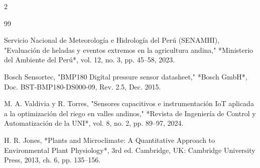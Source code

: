 \documentclass[a4paper, 11pt]{article}
\begin{document}
\begin{multicols}{2}
\begin{thebibliography}{99}

 Servicio Nacional de Meteorología e Hidrología del Perú (SENAMHI), "Evaluación de heladas y eventos extremos en la agricultura andina," *Ministerio del Ambiente del Perú*, vol. 12, no. 3, pp. 45--58, 2023.

 Bosch Sensortec, "BMP180 Digital pressure sensor datasheet," *Bosch GmbH*, Doc. BST-BMP180-DS000-09, Rev. 2.5, Dec. 2015.

 M. A. Valdivia y R. Torres, "Sensores capacitivos e instrumentación IoT aplicada a la optimización del riego en valles andinos," *Revista de Ingeniería de Control y Automatización de la UNI*, vol. 8, no. 2, pp. 89--97, 2024.

 H. R. Jones, *Plants and Microclimate: A Quantitative Approach to Environmental Plant Physiology*, 3rd ed. Cambridge, UK: Cambridge University Press, 2013, ch. 6, pp. 135--156.

\end{thebibliography}

\end{multicols}
\end{document}
